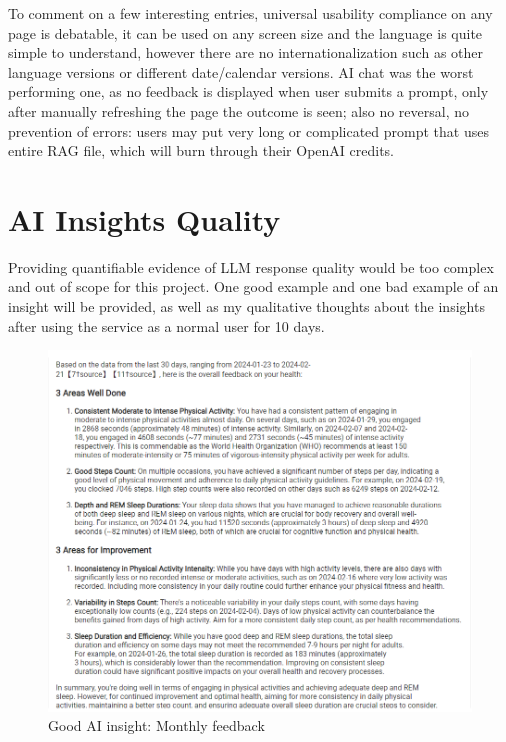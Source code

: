 To comment on a few interesting entries, universal usability compliance on any page is debatable, it can be used on any screen size and the language is quite simple to understand, however there are no internationalization such as other language versions or different date/calendar versions. AI chat was the worst performing one, as no feedback is displayed when user submits a prompt, only after manually refreshing the page the outcome is seen; also no reversal, no prevention of errors: users may put very long or complicated prompt that uses entire RAG file, which will burn through their OpenAI credits. 
\section{AI Insights Quality}
Providing quantifiable evidence of LLM response quality would be too complex and out of scope for this project. One good example and one bad example of an insight will be provided, as well as my qualitative thoughts about the insights after using the service as a normal user for 10 days. 
\begin{figure}
    
    \centering
    \includegraphics[width=1\textwidth,keepaspectratio]{../images/GoodAi.png}
    \caption{Good AI insight: Monthly feedback}
    \label{fig:goodAi}
    
\end{figure}
